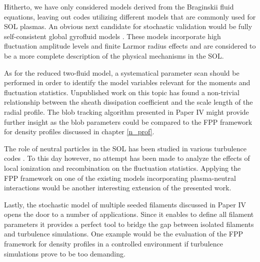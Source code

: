 Hitherto, we have only considered models derived from the Braginskii fluid equations,
leaving out codes utilizing different models that are commonly used for SOL plasmas. An
obvious next candidate for stochastic validation would be fully self-consistent global
gyrofluid models
\cite{madsen2013full,wiesenberger2014gyrofluid,wiesenberger2014radial,held2016influence,held2018non}.
These models incorporate high fluctuation amplitude levels and finite Larmor radius
effects and are considered to be a more complete description of the physical mechanisms
in the SOL.

As for the reduced two-fluid model, a systematical parameter scan should be performed in
order to identify the model variables relevant for the moments and fluctuation
statistics. Unpublished work on this topic has found a non-trivial relationship between
the sheath dissipation coefficient and the scale length of the radial profile. The blob
tracking algorithm presented in Paper IV might provide further insight as the blob
parameters could be compared to the FPP framework for density profiles discussed in
chapter \ref{n_prof}.

The role of neutral particles in the SOL has been studied in various turbulence codes
\cite{russell2011comparison,marandet2013influence,thrysoe2018plasma,bisai2018influence}.
To this day however, no attempt has been made to analyze the effects of local ionization
and recombination on the fluctuation statistics. Applying the FPP framework on one of
the existing models incorporating plasma-neutral interactions would be another
interesting extension of the presented work.

Lastly, the stochastic model of multiple seeded filaments discussed in Paper IV opens
the door to a number of applications. Since it enables to define all filament parameters
it provides a perfect tool to bridge the gap between isolated filaments and turbulence
simulations. One example would be the evaluation of the FPP framework for density
profiles in a controlled environment if turbulence simulations prove to be too
demanding.
